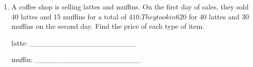 \documentclass[11pt]{article}
\begin{document}
\begin{enumerate}
{{ \[\begin{tikzpicture}[scale=0.39] \draw[step=1cm, gray!40, very thin] (-10,-10) grid (10,10); \draw[thick, <->] (-10.5,0) -- (10.5,0); \draw[thick, <->] (0,-10.5) -- (0,10.5); \clip (-10.5,-10.5) rectangle (10.5,10.5);\draw[dashed, red, thick] (-10.5, 6) -- (10.5, 6);\draw[blue, very thick, samples=100, domain=-10.5000000000000:5.643856189774724, smooth] plot (\x, {pow(2, \x - (1)) + (6)});\end{tikzpicture}\] 

}
}

\newpage

% 

\item %
\providecommand{\stxKnowl}{}\renewcommand{\stxKnowl}[1]{#1}
\providecommand{\stxOuttro}{}\renewcommand{\stxOuttro}[1]{#1}
\providecommand{\stxTitle}{}\renewcommand{\stxTitle}[1]{#1}
\renewcommand{\stxOuttro}[1]{}
\stxKnowl{
A coffee shop is selling lattes and muffins. On the first day of sales, they sold 40 lattes and 15 muffins for a total of $410. They took in $620 for 40 lattes and 30 muffins on the second day. Find the price of each type of item.

latte: ____________________

muffin: ____________________

\stxOuttro{
Solution

\[\begin{aligned} \text{Let } l &\text{ = price of latte} \\ \text{Let } m &\text{ = price of muffin} \\ \\ 40l + 15m &= 410 \\ 40l + 30m &= 620 \\ \\ \text{Subtract equations:} & \\ 15m &= 210 \\ m &= 14 \\ \\ \text{Substitute back:} & \\ 40l + 15(14) &= 410 \\ 40l + 210 &= 410 \\ 40l &= 200 \\ l &= 5 \end{aligned}\]

latte: \(\boxed{ \text{\$} 5 }\)

muffin: \(\boxed{ \text{\$} 14 }\)

}}
\end{enumerate}
\end{document}
